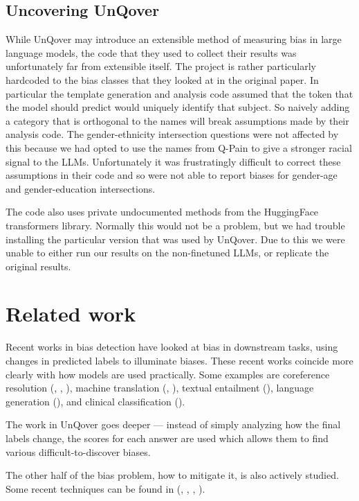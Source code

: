 \documentclass{article}
\begin{document}
\subsection{Uncovering UnQover}

While UnQover may introduce an extensible method of measuring bias in large language models, the code that they used to collect their results was unfortunately far from extensible itself.
The project is rather particularly hardcoded to the bias classes that they looked at in the original paper.
In particular the template generation and analysis code assumed that the token that the model should predict would uniquely identify that subject.
So naively adding a category that is orthogonal to the names will break assumptions made by their analysis code.
The gender-ethnicity intersection questions were not affected by this because we had opted to use the names from Q-Pain to give a stronger racial signal to the LLMs.
Unfortunately it was frustratingly difficult to correct these assumptions in their code and so were not able to report biases for gender-age and gender-education intersections.

The code also uses private undocumented methods from the HuggingFace transformers library.
Normally this would not be a problem, but we had trouble installing the particular version that was used by UnQover.
Due to this we were unable to either run our results on the non-finetuned LLMs, or replicate the original results.

\section{Related work}

Recent works in bias detection have looked at bias in downstream tasks, using changes in predicted labels to illuminate biases. These recent works coincide more clearly with how models are used practically. Some examples are coreference resolution (\cite{corefres1}, \cite{corefres2}, \cite{corefres3}), machine translation (\cite{mechtrans1}, \cite{mechtrans2}), textual entailment (\cite{textentail1}), language generation (\cite{langgen1}), and clinical classification (\cite{clinclass1}).

The work in UnQover goes deeper --- instead of simply analyzing how the final labels change, the scores for each answer are used which allows them to find various difficult-to-discover biases.

The other half of the bias problem, how to mitigate it, is also actively studied. Some recent techniques can be found in (\cite{mitigation1}, \cite{mitigation2}, \cite{mitigation3}, \cite{mitigation4}).
\end{document}
